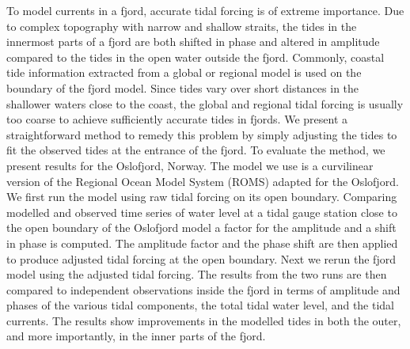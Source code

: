 \date{Received: date / Accepted: date}


\maketitle

To model currents in a fjord, accurate tidal forcing is of extreme importance. Due to complex topography with narrow and shallow straits, the tides in the innermost parts of a fjord are both shifted in phase and altered in amplitude compared to the tides in the open water outside the fjord.
Commonly, coastal tide information extracted from a global or regional model is used on the boundary of the fjord model.
Since tides vary over short distances in the shallower waters close to the coast, the global and regional tidal forcing is usually too coarse to achieve sufficiently accurate tides in fjords. We present a straightforward method to remedy this problem by simply adjusting the tides to fit the observed tides at the entrance of the fjord. 
To evaluate the method, we present results for the Oslofjord, Norway. The model we use is a curvilinear version of the Regional Ocean Model System (ROMS) adapted for the Oslofjord. We first run the model using raw tidal forcing on its open boundary. Comparing modelled and observed time series of water level at a tidal gauge station close to the open boundary of the Oslofjord model a factor for the amplitude and a shift in phase is computed. The amplitude factor and the phase shift are then applied to produce adjusted tidal forcing at the open boundary. Next we rerun the fjord model using the adjusted tidal forcing. The results from the two runs are then compared to independent observations inside the fjord in terms of amplitude and phases of the various tidal components, the total tidal water level, and the tidal currents. The results show improvements in the modelled tides in both the outer, and more importantly, in the inner parts of the fjord.

%











